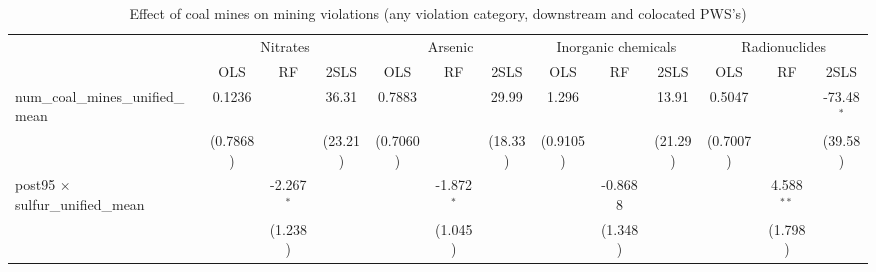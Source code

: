 
\begin{table}[htbp]
   
   \caption{\label{2sls_dwnstrmcolocate_minevio_allcat} Effect of coal mines on mining violations (any violation category, downstream and colocated PWS's)}
   \bigskip
   
   \centering
   
   \begin{adjustbox}{width = \textwidth, center}
      
      
      \begin{tabular}{lcccccccccccc}
         \toprule
         
          & \multicolumn{3}{c}{Nitrates} & \multicolumn{3}{c}{Arsenic} & \multicolumn{3}{c}{Inorganic chemicals} & \multicolumn{3}{c}{Radionuclides}\\
         
                                                                            & OLS                   & RF            & 2SLS          & OLS           & RF            & 2SLS          & OLS           & RF                    & 2SLS                  & OLS                   & RF            & 2SLS\\  
         
         \midrule 
         num\_coal\_mines\_unified\_mean                                    & 0.1236                &               & 36.31         & 0.7883        &               & 29.99         & 1.296         &                       & 13.91                 & 0.5047                &               & -73.48$^{*}$\\   
                                                                            & (0.7868)              &               & (23.21)       & (0.7060)      &               & (18.33)       & (0.9105)      &                       & (21.29)               & (0.7007)              &               & (39.58)\\   
         post95 $\times$ sulfur\_unified\_mean                              &                       & -2.267$^{*}$  &               &               & -1.872$^{*}$  &               &               & -0.8688               &                       &                       & 4.588$^{**}$  &   \\   
                                                                            &                       & (1.238)       &               &               & (1.045)       &               &               & (1.348)               &                       &                       & (1.798)       &   \\   
         

\end{tabular}
\end{adjustbox}
\end{table}
